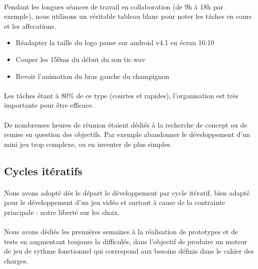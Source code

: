 \paragraph{}
Pendant les longues séances de travail en collaboration (de 9h à 18h par exemple), nous utilisons un véritable tableau blanc pour noter les tâches en cours et les affecations.

\begin{itemize}
\item Réadapter la taille du logo pause sur android v4.1 en écran 16:10
\item Couper les 150ms du début du son tic.wav
\item Revoir l’animation du bras gauche du champignon
\end{itemize}

\paragraph{}
Les tâches étant à 80\% de ce type (courtes et rapides), l’organisation est très importante pour être efficace.

\paragraph{}
De nombreuses heures de réunion étaient dédiés à la recherche de concept ou de remise en question des objectifs. Par exemple abandonner le développement d’un mini jeu trop complexe, ou en inventer de plus simples.

\subsection{Cycles itératifs}

\paragraph{}
Nous avons adopté dés le départ le développement par cycle itératif, bien adapté pour le développement d’un jeu vidéo et surtout à cause de la contrainte principale : notre liberté sur les choix.

\paragraph{}
Nous avons dédiés les premières semaines à la réalisation de prototypes et de tests en augmentant toujours la difficulés, dans l’objectif de produire un moteur de jeu de rythme fonctionnel qui correspond aux besoins définis dans le cahier des charges.


